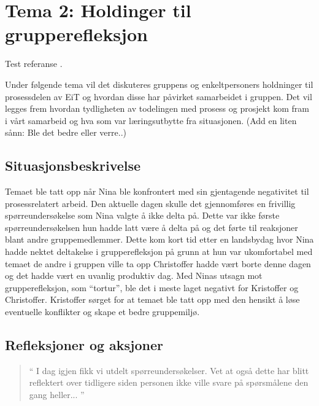 \chapter{Tema 2: Holdinger til grupperefleksjon}

Test referanse \cite{tdt4856}.

Under følgende tema vil det diskuteres gruppens og enkeltpersoners holdninger til prosessdelen av EiT og hvordan
disse har påvirket samarbeidet i gruppen. Det vil legges frem hvordan tydligheten av todelingen med prosess og 
prosjekt kom fram i vårt samarbeid og hva som var læringsutbytte fra situasjonen. (Add en liten sånn: Ble det bedre eller verre..)

\section{Situasjonsbeskrivelse}

Temaet ble tatt opp når Nina ble konfrontert med sin gjentagende negativitet til prosessrelatert arbeid. Den aktuelle 
dagen skulle det gjennomføres en frivillig spørreundersøkelse som Nina valgte å ikke delta på. Dette var ikke første 
spørreundersøkelsen hun hadde latt være å delta på og det førte til reaksjoner blant andre gruppemedlemmer. 
Dette kom kort tid etter en landsbydag hvor Nina hadde nektet deltakelse i grupperefleksjon på grunn at hun var 
ukomfortabel med temaet de andre i gruppen ville ta opp Christoffer hadde vært borte denne dagen og det hadde 
vært en uvanlig produktiv dag. Med Ninas utsagn mot grupperefleksjon, som ``tortur'', ble det i meste laget
negativt for Kristoffer og Christoffer. Kristoffer sørget for at temaet ble tatt opp med den hensikt å løse eventuelle
konflikter og skape et bedre gruppemiljø. 

\section{Refleksjoner og aksjoner}


\begin{quote}``
I dag igjen fikk vi utdelt spørreundersøkelser. Vet at også dette har blitt reflektert over tidligere siden personen ikke 
ville svare på spørsmålene den gang heller... 
''\end{quote} 


